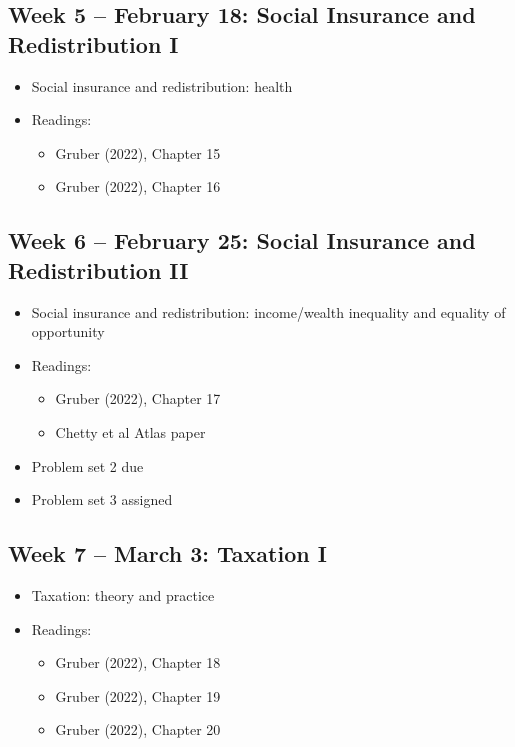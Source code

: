 \documentclass[11pt]{article}
\begin{document}
\subsection*{Week 5 -- February 18: Social Insurance and Redistribution I}
\begin{itemize}
    \setlength{\itemsep}{0em}
    \item Social insurance and redistribution: health
    \item Readings:
    \begin{itemize}
        \item Gruber (2022), Chapter 15
        \item Gruber (2022), Chapter 16
    \end{itemize}
\end{itemize}

\subsection*{Week 6 -- February 25: Social Insurance and Redistribution II}
\begin{itemize}
    \setlength{\itemsep}{0em}
    \item Social insurance and redistribution: income/wealth inequality and equality of opportunity
    \item Readings:
    \begin{itemize}
        \item Gruber (2022), Chapter 17
        \item Chetty et al Atlas paper
    \end{itemize}
        \item Problem set 2 due
    \item Problem set 3 assigned
\end{itemize}

\subsection*{Week 7 -- March 3: Taxation I}
\begin{itemize}
    \setlength{\itemsep}{0em}
    \item Taxation: theory and practice
    \item Readings:
    \begin{itemize}
        \item Gruber (2022), Chapter 18
        \item Gruber (2022), Chapter 19
        \item Gruber (2022), Chapter 20
    \end{itemize}
\end{itemize}
\end{document}
